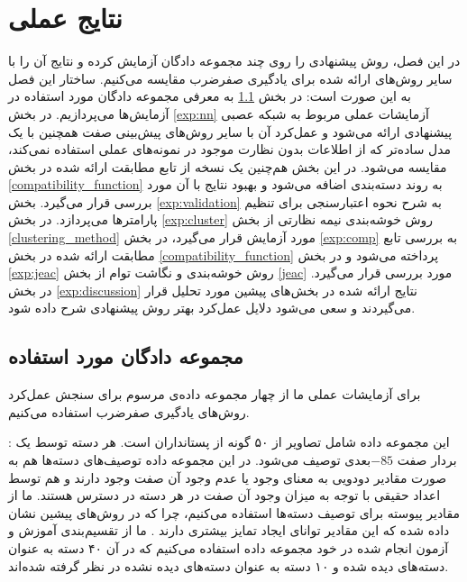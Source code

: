 \chapter{نتایج عملی} \label{chap:experiments}
در این فصل، روش پیشنهادی را روی چند مجموعه دادگان آزمایش کرده و نتایج آن را با سایر روش‌های ارائه شده برای یادگیری صفرضرب مقایسه می‌کنیم. ساختار این فصل به این صورت است:
 در بخش \ref{exp:datasets} به معرفی مجموعه دادگان مورد استفاده در آزمایش‌ها می‌پردازیم.
در  بخش \ref{exp:nn} آزمایشات عملی مربوط به شبکه عصبی پیشنهادی ارائه می‌شود و عمل‌کرد آن با سایر روش‌های پیش‌بینی صفت همچنین با یک مدل ساده‌تر که از اطلاعات بدون نظارت موجود در نمونه‌های عملی استفاده نمی‌کند، مقایسه می‌شود. در این بخش هم‌چنین یک نسخه از  تابع مطابقت ارائه شده در بخش \ref{compatibility_function} به روند دسته‌بندی اضافه می‌شود و بهبود نتایج با آن مورد بررسی قرار می‌گیرد.
بخش \ref{exp:validation} به شرح نحوه اعتبارسنجی برای تنظیم پارامترها می‌پردازد.
 در بخش \ref{exp:cluster} روش خوشه‌بندی نیمه نظارتی از بخش \ref{clustering_method} مورد آزمایش قرار می‌گیرد،
  در بخش \ref{exp:comp} به بررسی تابع مطابقت ارائه شده  در بخش \ref{compatibility_function} پرداخته می‌شود
   و در بخش \ref{exp:jeac} روش خوشه‌بندی و نگاشت توام از بخش \ref{jeac} مورد بررسی قرار می‌گیرد.
    در بخش \ref{exp:discussion} نتایج ارائه شده در بخش‌های پیشین مورد تحلیل قرار می‌گیردند و سعی می‌شود دلایل عمل‌کرد بهتر روش پیشنهادی شرح داده شود.


\section{مجموعه دادگان مورد استفاده}\label{exp:datasets}
برای آزمایشات عملی ما از چهار مجموعه داده‌ی مرسوم برای سنجش عمل‌کرد روش‌های یادگیری صفرضرب استفاده می‌کنیم.

\textbf{} \cite{lampert09}:
این مجموعه داده شامل تصاویر از ۵۰ گونه از پستانداران است. هر دسته توسط یک بردار صفت $-85$بعدی توصیف می‌شود. در این مجموعه داده توصیف‌های دسته‌ها هم به صورت مقادیر دودویی به معنای وجود یا عدم وجود آن صفت وجود دارند و هم توسط اعداد حقیقی با توجه به میزان وجود آن صفت در هر دسته در دسترس هستند. ما از مقادیر پیوسته برای توصیف دسته‌ها استفاده می‌کنیم، چرا که در روش‌های پیشین نشان داده شده که این مقادیر توانای ایجاد تمایز بیشتری دارند \cite{Akata2015}. ما از تقسیم‌بندی آموزش و آزمون انجام شده در خود مجموعه داده استفاده می‌کنیم که در آن ۴۰ دسته به عنوان دسته‌های دیده شده و ۱۰ دسته به عنوان
دسته‌های دیده نشده در نظر گرفته شده‌اند.

